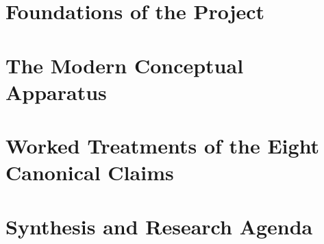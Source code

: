 \documentclass[11pt,a4paper,openany]{book}
\theoremstyle{cleanrm}
\begin{document}
\tableofcontents
\cleardoublepage






\mainmatter

\part{Foundations of the Project}






\part{The Modern Conceptual Apparatus}







\part{Worked Treatments of the Eight Canonical Claims}










\part{Synthesis and Research Agenda}






\backmatter


\end{document}
